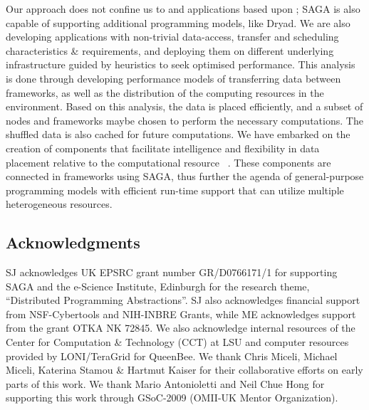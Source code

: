 \documentclass[3p,twocolumn]{elsarticle}
\begin{document}
Our approach does not confine us to \mr and applications based upon
\mr; SAGA is also capable of supporting additional programming models,
like Dryad.  We are also developing applications with non-trivial
data-access, transfer and scheduling characteristics \& requirements,
and deploying them on different underlying infrastructure guided by
heuristics to seek optimised performance.
This analysis is done through developing performance models of
transferring data between frameworks, as well as the distribution of
the computing resources in the environment. Based on this analysis,
the data is placed efficiently, and a subset of nodes and frameworks
maybe chosen to perform the necessary computations. The shuffled data
is also cached for future computations.  We have embarked on the
creation of components that facilitate intelligence and flexibility in
data placement relative to the computational resource
~\cite{saga_dic_royalsoc09}. These components are connected in
frameworks using SAGA, thus further the agenda of general-purpose
programming models with efficient run-time support that can utilize
multiple heterogeneous resources.



\subsection*{Acknowledgments}

\small{ SJ acknowledges UK EPSRC grant number GR/D0766171/1 for
supporting SAGA and the e-Science Institute, Edinburgh for the
research theme, ``Distributed Programming Abstractions''.  SJ also
acknowledges financial support from NSF-Cybertools and NIH-INBRE
Grants, while ME acknowledges support from the grant OTKA NK 72845.
We also acknowledge internal resources of the Center for Computation
\& Technology (CCT) at LSU and computer resources provided by
LONI/TeraGrid for QueenBee.  We thank Chris Miceli, Michael Miceli,
Katerina Stamou \& Hartmut Kaiser for their collaborative efforts on
early parts of this work. We thank Mario Antonioletti and Neil Chue
Hong for supporting this work through GSoC-2009 (OMII-UK Mentor
Organization).}



\end{document}
